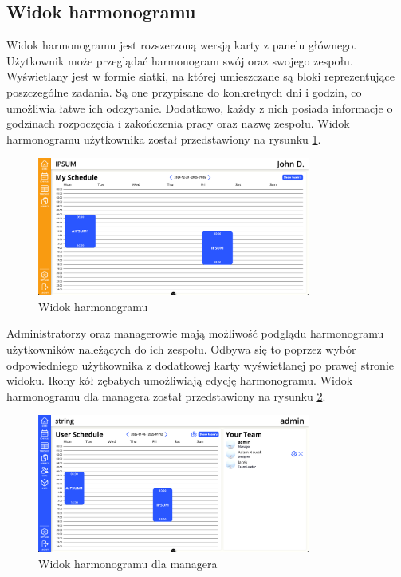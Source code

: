 \subsection{Widok harmonogramu}

Widok harmonogramu jest rozszerzoną wersją karty z panelu głównego. Użytkownik może przeglądać harmonogram swój oraz swojego zespołu. Wyświetlany jest w formie siatki, na której umieszczane są bloki reprezentujące poszczególne zadania. Są one przypisane do konkretnych dni i godzin, co umożliwia łatwe ich odczytanie. Dodatkowo, każdy z nich posiada informacje o godzinach rozpoczęcia i zakończenia pracy oraz nazwę zespołu. Widok harmonogramu użytkownika został przedstawiony na rysunku \ref{fig:scheduleView}.

\begin{figure}
    \centering
    \includegraphics[width=0.8\textwidth, frame]{graf/front/schedule.png}
    \caption{Widok harmonogramu}
    \label{fig:scheduleView}
\end{figure}

Administratorzy oraz managerowie mają możliwość podglądu harmonogramu użytkowników należących do ich zespołu. Odbywa się to poprzez wybór odpowiedniego użytkownika z dodatkowej karty wyświetlanej po prawej stronie widoku. Ikony kół zębatych umożliwiają edycję harmonogramu. Widok harmonogramu dla managera został przedstawiony na rysunku \ref{fig:scheduleManagerView}.

\begin{figure}[H]
    \centering
    \includegraphics[width=0.8\textwidth, frame]{graf/front/userSchedule.png}
    \caption{Widok harmonogramu dla managera}
    \label{fig:scheduleManagerView}
\end{figure}

